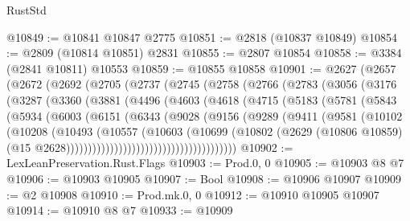 \begin{lexlean}{RustStd}
\begin{coremodule}
{\begin{coremodule}
{{{{{{{{{{{{{{{{{{{{{{{{{{{{{{{{{@10849 := @10841 @10847 @2775
@10851 := @2818 (@10837 @10849)
@10854 := @2809 (@10814 @10851) @2831
@10855 := @2807 @10854
@10858 := @3384 (@2841 @10811) @10553
@10859 := @10855 @10858
@10901 := @2627
    (@2657
      (@2672
        (@2692
          (@2705
            (@2737
              (@2745
                (@2758
                  (@2766
                    (@2783
                      (@3056
                        (@3176
                          (@3287
                            (@3360
                              (@3881
                                (@4496
                                  (@4603
                                    (@4618
                                      (@4715
                                        (@5183
                                          (@5781
                                            (@5843
                                              (@5934
                                                (@6003
                                                  (@6151
                                                    (@6343
                                                      (@9028
                                                        (@9156
                                                          (@9289
                                                            (@9411
                                                              (@9581
                                                                (@10102
                                                                  (@10208
                                                                    (@10493
                                                                      (@10557
                                                                        (@10603
                                                                          (@10699
                                                                            (@10802
                                                                              (@2629
                                                                                (@10806 @10859)
                                                                                (@15
                                                                                  @2628)))))))))))))))))))))))))))))))))))))))
@10902 := LexLeanPreservation.Rust.Flags
@10903 := Prod.{0, 0}
@10905 := @10903 @8 @7
@10906 := @10903 @10905
@10907 := Bool
@10908 := @10906 @10907
@10909 := @2 @10908
@10910 := Prod.mk.{0, 0}
@10912 := @10910 @10905 @10907
@10914 := @10910 @8 @7
@10933 := @10909
}}}}}}}}}}}}}}}}}}}}}}}}}}}}}}}}}
\end{coremodule}}
\end{coremodule}
\end{lexlean}
